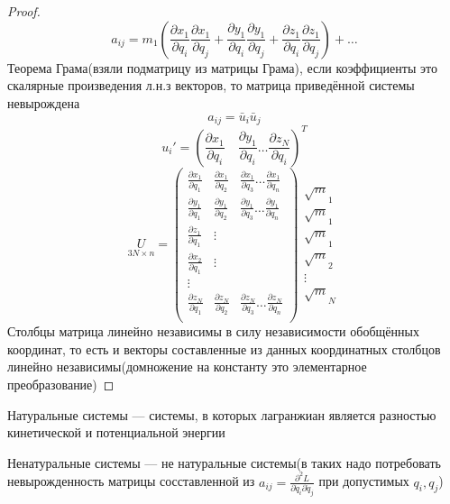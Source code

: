 \documentclass[crop=false]{standalone}
\begin{document}
    \begin{proof}
    \[a_{i j} = m_1 \left( \frac{\partial x_1}{\partial q_i} \frac{\partial x_1}{\partial q_j} + \frac{\partial y_1}{\partial q_i} \frac{\partial y_1}{\partial q_j} + \frac{\partial z_1}{\partial q_i} \frac{\partial z_1}{\partial q_j}\right) + \dots\]
    Теорема Грама(взяли подматрицу  из матрицы Грама), если коэффициенты это скалярные произведения л.н.з векторов, то матрица приведённой системы невырождена
    \[a_{i j} = \bar u_i \bar u_j\]
    \[u_i' = \left(\frac{\partial x_1}{\partial q_i} \quad \frac{\partial y_1}{\partial q_i} \dots \frac{\partial z_N}{\partial q_i}\right)^T\]
    \[
    \underset{3 N \times n}{U}= \begin{pmatrix}
        \frac{\partial x_1}{\partial q_1} & \frac{\partial x_1}{\partial q_2} & \frac{\partial x_1}{\partial q_3} \dots \frac{\partial x_1}{\partial q_n} \\
        \frac{\partial y_1}{\partial q_1} & \frac{\partial y_1}{\partial q_2} & \frac{\partial y_1}{\partial q_3} \dots \frac{\partial y_1}{\partial q_n} \\
        \frac{\partial z_1}{\partial q_1} & \vdots \\
        \frac{\partial x_2}{\partial q_1} & \vdots \\
        \vdots \\
        \frac{\partial z_N}{\partial q_1} & \frac{\partial z_N}{\partial q_2} & \frac{\partial z_N}{\partial q_3} \dots \frac{\partial z_N}{\partial q_n} \\
    \end{pmatrix} \begin{matrix}
        \sqrt m_1 \\ \sqrt m_1 \\ \sqrt m_1 \\ \sqrt m_2  \\ \vdots \\  \sqrt m_N %
    \end{matrix}
    \]
    Столбцы матрица линейно независимы в силу независимости обобщённых координат, то есть и векторы составленные из данных координатных столбцов линейно независимы(домножение на константу это элементарное преобразование)
\end{proof}



\Def Натуральные системы — системы, в которых лагранжиан является разностью кинетической и потенциальной энергии

\Def Ненатуральные системы — не натуральные системы(в таких надо потребовать невырожденность матрицы сосставленной из $a_{i j} = \frac{\partial^2 L}{\partial \dot q_i \partial \dot q_j}$ при допустимых $q_i , q_j$)
\end{document}
